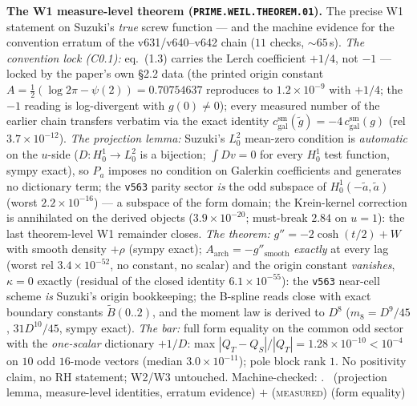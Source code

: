 \documentclass[11pt,a4paper]{article}
\theoremstyle{definition}
\begin{document}
\par\smallskip\noindent\textbf{The W1 measure-level theorem
(\texttt{PRIME.WEIL.THEOREM.01}).}
The precise W1 statement on Suzuki's \emph{true} screw function ---
and the machine evidence for the convention erratum of the
v631/v640--v642 chain ($11$ checks, ${\sim}65$\,s).  \emph{The
convention lock (C0.1):} eq.~(1.3) carries the Lerch coefficient
$+1/4$, not $-1$ --- locked by the paper's own \S2.2 data (the printed
origin constant $A=\tfrac12(\log2\pi-\psi(2))=0.70754637$ reproduces
to $1.2\times10^{-9}$ with $+1/4$; the $-1$ reading is log-divergent
with $g(0)\ne0$); every measured number of the earlier chain transfers
verbatim via the exact identity
$c^{\mathrm{sm}}_{\mathrm{gal}}(\tilde g)=-4\,c^{\mathrm{sm}}_{\mathrm{gal}}(g)$
(rel $3.7\times10^{-12}$).  \emph{The projection lemma:} Suzuki's
$L^2_0$ mean-zero condition is \emph{automatic} on the $u$-side
($D:H^1_0\to L^2_0$ is a bijection; $\int Dv=0$ for every $H^1_0$
test function, sympy exact), so $P_a$ imposes no condition on Galerkin
coefficients and generates no dictionary term; the \texttt{v563}
parity sector \emph{is} the odd subspace of
$H^1_0(-\tilde a,\tilde a)$ (worst $2.2\times10^{-16}$) --- a subspace
of the form domain; the Krein-kernel correction is annihilated on the
derived objects ($3.9\times10^{-20}$; must-break $2.84$ on $u=1$):
the last theorem-level W1 remainder closes.  \emph{The theorem:}
$g''=-2\cosh(t/2)+W$ with smooth density $+\rho$ (sympy exact);
$A_{\mathrm{arch}}=-g''_{\mathrm{smooth}}$ \emph{exactly} at every lag
(worst rel $3.4\times10^{-52}$, no constant, no scalar) and the origin
constant \emph{vanishes}, $\kappa=0$ exactly (residual of the closed
identity $6.1\times10^{-55}$): the \texttt{v563} near-cell scheme
\emph{is} Suzuki's origin bookkeeping; the B-spline reads close with
exact boundary constants $\tilde B(0..2)$, and the moment law is
derived to $D^8$ ($m_8=D^9/45$, $31D^{10}/45$, sympy exact).
\emph{The bar:} full form equality on the common odd sector with the
\emph{one-scalar} dictionary $+1/D$: max
$|Q_T-Q_S|/|Q_T|=1.28\times10^{-10}<10^{-4}$ on $10$ odd $16$-mode
vectors (median $3.0\times10^{-11}$); pole block rank $1$.  No
positivity claim, no RH statement; W2/W3 untouched.
Machine-checked: .
\mE\ (projection lemma, measure-level identities, erratum evidence)
$+$ (\textsc{measured}) (form equality)
\par\smallskip
\end{document}

